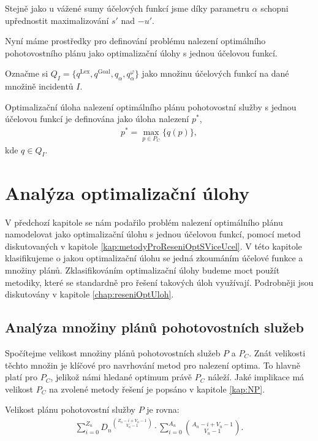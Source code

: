 Stejně jako u vážené sumy účelových funkcí jsme díky parametru $\alpha$ schopni upřednostit maximalizování $s'$ nad $-u'$.

Nyní máme prostředky pro definování problému nalezení optimálního pohotovostního plánu jako optimalizační úlohy s jednou účelovou funkcí.

Označme si $Q_I = \{ q^{\text{Lex}}, q^{\text{Goal}}, q_{\alpha}, q_{\alpha}^{\varphi}\}$ jako množinu účelových funkcí na dané množině incidentů $I$.
\begin{definice}\label{df:optUloha1uc}
  Optimalizační úloha nalezení optimálního plánu pohotovostní služby s jednou účelovou funkcí je definována jako úloha nalezení $p^*$,
  \begin{align}
    p^* = \max_{p \in P_C} \{ q(p) \},
  \end{align}
  kde $q \in Q_I$.
\end{definice}

\section{Analýza optimalizační úlohy}

V předchozí kapitole se nám podařilo problém nalezení optimálního plánu namodelovat jako optimalizační úlohu s jednou účelovou funkcí,
pomocí metod diskutovaných v kapitole \ref{kap:metodyProReseniOptSViceUcel}.
V této kapitole klasifikujeme o jakou optimalizační úlohu se jedná zkoumáním účelové funkce a množiny plánů.
Zklasifikováním optimalizační úlohy budeme moct použít metodiky, které se standardně pro řešení takových úloh využívají. 
Podrobněji jsou diskutovány v kapitole \ref{chap:reseniOptUloh}.

\subsection{Analýza množiny plánů pohotovostních služeb}\label{kap:analP}

Spočítejme velikost množiny plánů pohotovostních služeb $P$ a $P_C$.
Znát velikosti těchto množin je klíčové pro navrhování metod pro nalezení optima.
To hlavně platí pro $P_C$, jelikož námi hledané optimum právě $P_C$ náleží.
Jaké implikace má velikost $P_C$ na zvolené metody řešení je popsáno v kapitole \ref{kap:NP}.

\begin{veta}\label{veta:velikostP}
  Velikost plánu pohotovostní služby $P$ je rovna:
  \begin{align*}
    \sum_{i = 0}^{Z_n} {D_n}^{\binom{Z_n - i + V_n - 1}{V_n - 1}} \cdot \sum_{i = 0}^{A_n} {\binom{A_n - i + V_n - 1}{V_n - 1}}.
  \end{align*}
\end{veta}

